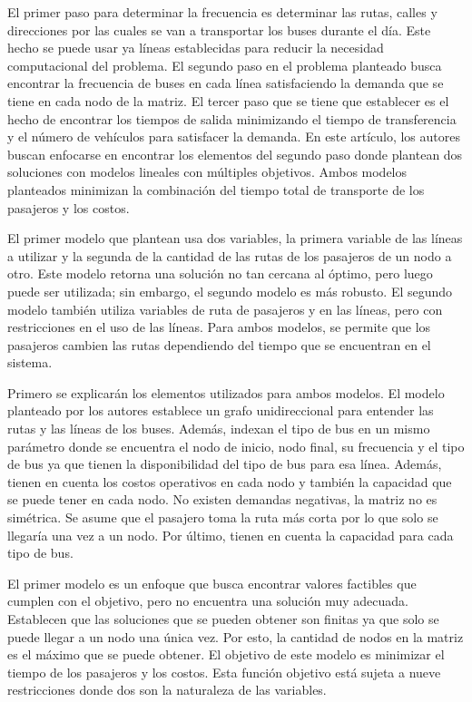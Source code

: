 \documentclass[preprint,11pt]{elsarticle}
\begin{document}
El primer paso para determinar la frecuencia es determinar las rutas, calles y direcciones por las cuales se van a transportar los buses durante el día. Este hecho se puede usar ya líneas establecidas para reducir la necesidad computacional del problema. El segundo paso en el problema planteado busca encontrar la frecuencia de buses en cada línea satisfaciendo la demanda que se tiene en cada nodo de la matriz. El tercer paso que se tiene que establecer es el hecho de encontrar los tiempos de salida minimizando el tiempo de transferencia y el número de vehículos para satisfacer la demanda. En este artículo, los autores buscan enfocarse en encontrar los elementos del segundo paso donde plantean dos soluciones con modelos lineales con múltiples objetivos. Ambos modelos planteados minimizan la combinación del tiempo total de transporte de los pasajeros y los costos.

El primer modelo que plantean usa dos variables, la primera variable de las líneas a utilizar y la segunda de la cantidad de las rutas de los pasajeros de un nodo a otro. Este modelo retorna una solución no tan cercana al óptimo, pero luego puede ser utilizada; sin embargo, el segundo modelo es más robusto. El segundo modelo también utiliza variables de ruta de pasajeros y en las líneas, pero con restricciones en el uso de las líneas. Para ambos modelos, se permite que los pasajeros cambien las rutas dependiendo del tiempo que se encuentran en el sistema.

Primero se explicarán los elementos utilizados para ambos modelos. El modelo planteado por los autores establece un grafo unidireccional para entender las rutas y las líneas de los buses. Además, indexan el tipo de bus en un mismo parámetro donde se encuentra el nodo de inicio, nodo final, su frecuencia y el tipo de bus ya que tienen la disponibilidad del tipo de bus para esa línea. Además, tienen en cuenta los costos operativos en cada nodo y también la capacidad que se puede tener en cada nodo. No existen demandas negativas, la matriz no es simétrica. Se asume que el pasajero toma la ruta más corta por lo que solo se llegaría una vez a un nodo. Por último, tienen en cuenta la capacidad para cada tipo de bus.

El primer modelo es un enfoque que busca encontrar valores factibles que cumplen con el objetivo, pero no encuentra una solución muy adecuada. Establecen que las soluciones que se pueden obtener son finitas ya que solo se puede llegar a un nodo una única vez. Por esto, la cantidad de nodos en la matriz es el máximo que se puede obtener. El objetivo de este modelo es minimizar el tiempo de los pasajeros y los costos. Esta función objetivo está sujeta a nueve restricciones donde dos son la naturaleza de las variables.
\end{document}
